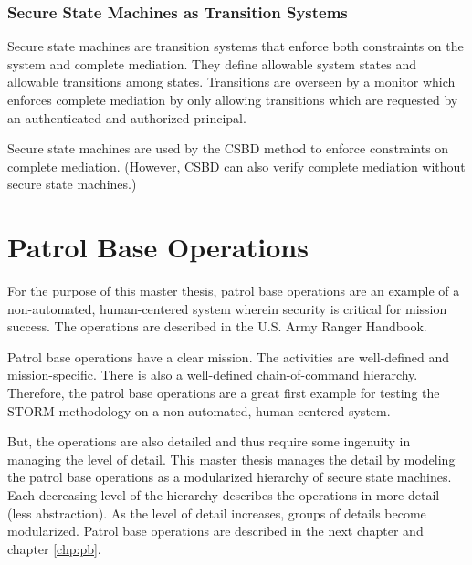 \documentclass[../../main/main.tex]{subfiles}
\begin{document}
\subsubsection{Secure State Machines as Transition Systems }\label{sssect:ssmts}

Secure state machines are transition systems that enforce both constraints on the system and complete mediation.  They define allowable system states and allowable transitions among states. Transitions are overseen by a monitor which enforces complete mediation by only allowing transitions which are requested by an authenticated and authorized principal. 

Secure state machines are used by the CSBD method to enforce constraints on complete mediation.  (However, CSBD can also verify complete mediation without secure state machines.)
\section{Patrol Base Operations}\label{sec:stormpb}
For the purpose of this master thesis, patrol base operations are an example of a non-automated, human-centered system wherein security is critical for mission success.  The operations are described in the U.S. Army Ranger Handbook.


Patrol base operations have a clear mission.  The activities are well-defined and mission-specific.  There is also a well-defined chain-of-command hierarchy.  Therefore, the patrol base operations are a great first example for testing the STORM methodology on a non-automated, human-centered system.  

But, the operations are also detailed and thus require some ingenuity in managing the level of detail.  This master thesis manages the detail by modeling the patrol base operations as a modularized hierarchy of secure state machines.  Each decreasing level of the hierarchy describes the operations in more detail (less abstraction).  As the level of detail increases, groups of details become modularized.  Patrol base operations are described in the next chapter and chapter \ref{chp:pb}.  
\end{document}
